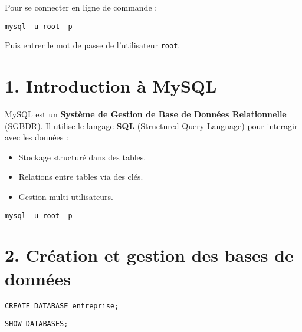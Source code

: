 \documentclass[a4paper,11pt]{article}
\begin{document}
\begin{tcolorbox}[colback=red!5!white,colframe=red!75!black,title=Connexion à MySQL]
Pour se connecter en ligne de commande :
\begin{verbatim}
mysql -u root -p
\end{verbatim}
Puis entrer le mot de passe de l’utilisateur \texttt{root}.
\end{tcolorbox}


\section*{1. Introduction à MySQL}

\begin{tcolorbox}[colback=blue!5!white,colframe=blue!75!black,title=Qu'est-ce que MySQL ?]
MySQL est un \textbf{Système de Gestion de Base de Données Relationnelle} (SGBDR). 
Il utilise le langage \textbf{SQL} (Structured Query Language) pour interagir avec les données :
\begin{itemize}
    \item Stockage structuré dans des tables.
    \item Relations entre tables via des clés.
    \item Gestion multi-utilisateurs.
\end{itemize}
\end{tcolorbox}

\begin{tcolorbox}[colback=yellow!5!white,colframe=yellow!75!black,title=Connexion à MySQL]
\begin{verbatim}
mysql -u root -p
\end{verbatim}
\end{tcolorbox}

\section*{2. Création et gestion des bases de données}

\begin{tcolorbox}[colback=green!5!white,colframe=green!75!black,title=Créer une base de données]
\begin{verbatim}
CREATE DATABASE entreprise;
\end{verbatim}
\end{tcolorbox}

\begin{tcolorbox}[colback=green!5!white,colframe=green!75!black,title=Afficher les bases existantes]
\begin{verbatim}
SHOW DATABASES;
\end{verbatim}
\end{tcolorbox}
\end{document}
